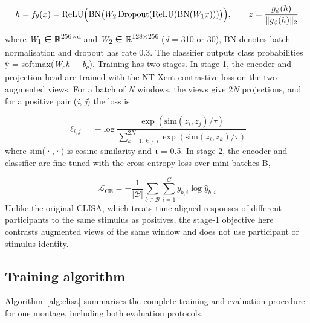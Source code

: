 \begin{equation}
  h=f_\theta(x)=\mathrm{ReLU}\Bigl(\mathrm{BN}\bigl(W_2\,\mathrm{Dropout}(\mathrm{ReLU}(\mathrm{BN}(W_1x)))\bigr)\Bigr),\qquad z=\frac{g_\phi(h)}{\lVert g_\phi(h)\rVert_2}
  \label{eq:encoder}
\end{equation}
where \emph{W}\textsubscript{1} ∈ ℝ\textsuperscript{256×d} and \emph{W}\textsubscript{2} ∈ ℝ\textsuperscript{128×256} (\emph{d} = 310 or 30), BN denotes batch normalisation and dropout has rate 0.3. The classifier outputs class probabilities ŷ = softmax(\emph{W}\textsubscript{c}\emph{h} + \emph{b}\textsubscript{c}). Training has two stages. In stage 1, the encoder and projection head are trained with the NT-Xent contrastive loss\cite{simclr} on the two augmented views. For a batch of \emph{N} windows, the views give 2\emph{N} projections, and for a positive pair (\emph{i}, \emph{j}) the loss is

\begin{equation}
  \ell_{i,j} = -\log \frac{\exp\left(\mathrm{sim}(z_i,z_j)/\tau\right)}{\sum_{k=1,\,k\neq i}^{2N}\exp\left(\mathrm{sim}(z_i,z_k)/\tau\right)}
  \label{eq:ntxent}
\end{equation}
where sim(·,·) is cosine similarity and τ = 0.5. In stage 2, the encoder and classifier are fine-tuned with the cross-entropy loss over mini-batches B,

\begin{equation}
  \mathcal{L}_{\mathrm{CE}}=-\frac{1}{|\mathcal{B}|}\sum_{b\in\mathcal{B}}\sum_{i=1}^{C}y_{b,i}\log\hat{y}_{b,i}
  \label{eq:ce}
\end{equation}
Unlike the original CLISA\cite{clisa}, which treats time-aligned responses of different participants to the same stimulus as positives, the stage-1 objective here contrasts augmented views of the same window and does not use participant or stimulus identity.


\subsection{Training algorithm}
Algorithm~\ref{alg:clisa} summarises the complete training and evaluation procedure for one montage, including both evaluation protocols.

